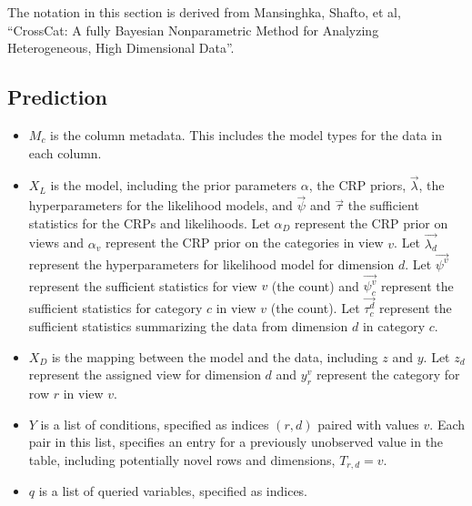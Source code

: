 \documentclass[11pt]{article}
\begin{document}
The notation in this section is derived from Mansinghka, Shafto, et al, ``CrossCat: A fully Bayesian Nonparametric Method for Analyzing Heterogeneous, High Dimensional Data''. 

\subsection{Prediction}

\begin{itemize}
\item $M_c$ is the column metadata. This includes the model types for the data in each column.
\item $X_L$ is the model, including the prior parameters $\alpha$, the CRP priors, $\vec{\lambda}$, the hyperparameters for the likelihood models, and $\vec{\psi}$ and $\vec{\tau}$ the sufficient statistics for the CRPs and likelihoods. Let $\alpha_D$ represent the CRP prior on views and $\alpha_v$ represent the CRP prior on the categories in view $v$. 
Let $\vec{\lambda_d}$ represent the hyperparameters for likelihood model for dimension $d$. 
Let $\vec{\psi^v}$ represent the sufficient statistics for view $v$ (the count) and $\vec{\psi^v_c}$ represent the sufficient statistics for category $c$ in view $v$ (the count).
Let $\vec{\tau^d_c}$ represent the sufficient statistics summarizing the data from dimension $d$ in category $c$.

\item $X_D$ is the mapping between the model and the data, including $z$ and $y$. Let $z_d$ represent the assigned view for dimension $d$ and $y^v_r$ represent the category for row $r$ in view $v$.

\item $Y$ is a list of conditions, specified as indices $(r,d)$ paired with values $v$. Each pair in this list, specifies an entry for a previously unobserved value in the table, including potentially novel rows and dimensions, $T_{r,d}=v$. 

\item $q$ is a list of queried variables, specified as indices. 

\end{itemize}
\end{document}
